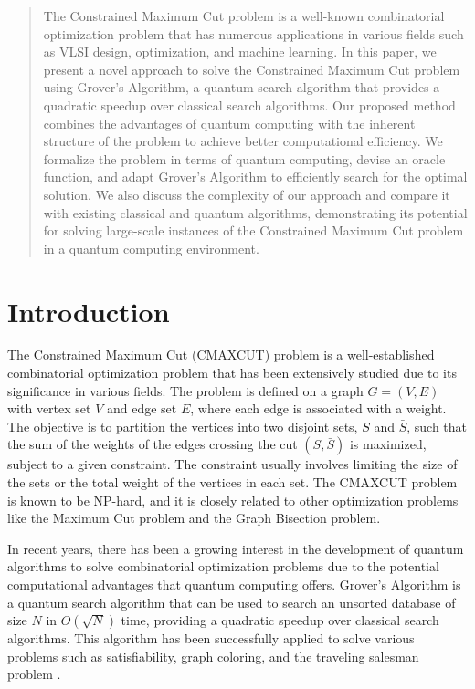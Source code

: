 \begin{abstract}
The Constrained Maximum Cut problem is a well-known combinatorial optimization problem that has numerous applications in various fields such as VLSI design, optimization, and machine learning. In this paper, we present a novel approach to solve the Constrained Maximum Cut problem using Grover's Algorithm, a quantum search algorithm that provides a quadratic speedup over classical search algorithms. Our proposed method combines the advantages of quantum computing with the inherent structure of the problem to achieve better computational efficiency. We formalize the problem in terms of quantum computing, devise an oracle function, and adapt Grover's Algorithm to efficiently search for the optimal solution. We also discuss the complexity of our approach and compare it with existing classical and quantum algorithms, demonstrating its potential for solving large-scale instances of the Constrained Maximum Cut problem in a quantum computing environment.
\end{abstract}

\section{Introduction}

The Constrained Maximum Cut (CMAXCUT) problem is a well-established combinatorial optimization problem that has been extensively studied due to its significance in various fields. The problem is defined on a graph $G=(V, E)$ with vertex set $V$ and edge set $E$, where each edge is associated with a weight. The objective is to partition the vertices into two disjoint sets, $S$ and $\bar{S}$, such that the sum of the weights of the edges crossing the cut $(S, \bar{S})$ is maximized, subject to a given constraint. The constraint usually involves limiting the size of the sets or the total weight of the vertices in each set. The CMAXCUT problem is known to be NP-hard, and it is closely related to other optimization problems like the Maximum Cut problem and the Graph Bisection problem.

In recent years, there has been a growing interest in the development of quantum algorithms to solve combinatorial optimization problems due to the potential computational advantages that quantum computing offers. Grover's Algorithm \cite{grover1996fast} is a quantum search algorithm that can be used to search an unsorted database of size $N$ in $O(\sqrt{N})$ time, providing a quadratic speedup over classical search algorithms. This algorithm has been successfully applied to solve various problems such as satisfiability, graph coloring, and the traveling salesman problem \cite{shor1997polynomial, childs2003exponential, ambainis2019quantum}.

